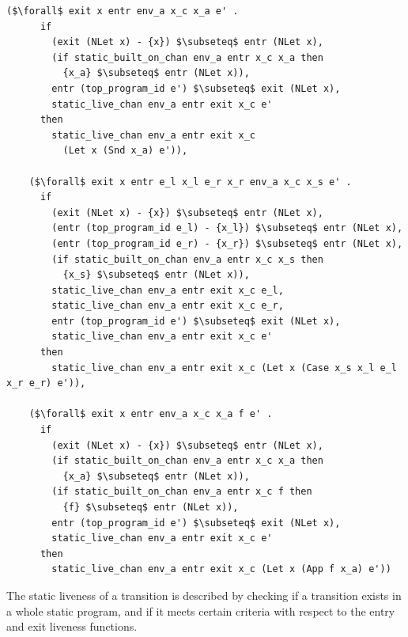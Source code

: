 \documentclass{article}
\begin{document}
\begin{lstlisting}[language=logic, mathescape]
    ($\forall$ exit x entr env_a x_c x_a e' .
      if 
        (exit (NLet x) - {x}) $\subseteq$ entr (NLet x),
        (if static_built_on_chan env_a entr x_c x_a then
          {x_a} $\subseteq$ entr (NLet x)),
        entr (top_program_id e') $\subseteq$ exit (NLet x),
        static_live_chan env_a entr exit x_c e'
      then
        static_live_chan env_a entr exit x_c
          (Let x (Snd x_a) e')),

    ($\forall$ exit x entr e_l x_l e_r x_r env_a x_c x_s e' .
      if 
        (exit (NLet x) - {x}) $\subseteq$ entr (NLet x),
        (entr (top_program_id e_l) - {x_l}) $\subseteq$ entr (NLet x),
        (entr (top_program_id e_r) - {x_r}) $\subseteq$ entr (NLet x),
        (if static_built_on_chan env_a entr x_c x_s then
          {x_s} $\subseteq$ entr (NLet x)),
        static_live_chan env_a entr exit x_c e_l,
        static_live_chan env_a entr exit x_c e_r,
        entr (top_program_id e') $\subseteq$ exit (NLet x),
        static_live_chan env_a entr exit x_c e'
      then 
        static_live_chan env_a entr exit x_c (Let x (Case x_s x_l e_l x_r e_r) e')),

    ($\forall$ exit x entr env_a x_c x_a f e' .
      if
        (exit (NLet x) - {x}) $\subseteq$ entr (NLet x),
        (if static_built_on_chan env_a entr x_c x_a then
          {x_a} $\subseteq$ entr (NLet x)),
        (if static_built_on_chan env_a entr x_c f then
          {f} $\subseteq$ entr (NLet x)),
        entr (top_program_id e') $\subseteq$ exit (NLet x),
        static_live_chan env_a entr exit x_c e'
      then
        static_live_chan env_a entr exit x_c (Let x (App f x_a) e'))
  \end{lstlisting}

The static liveness of a transition is described by checking if a transition exists in a whole
static program, and if it meets certain criteria with respect to the entry and exit liveness
functions. 
\end{document}
